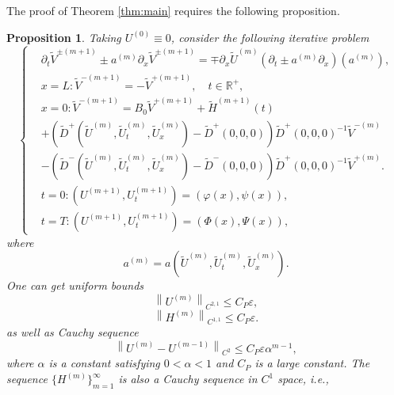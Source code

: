 \documentclass[a4paper,reqno,11pt]{amsart}
\numberwithin{equation}{section} %
\newtheorem{prop}[lem]{Proposition}
\begin{document}
The proof of Theorem \ref{thm:main} requires the following proposition.
\begin{prop}\label{prop:main}
	Taking $U^{(0)}\equiv 0$, consider the following iterative problem
	\begin{equation}
		\begin{cases}
		& \partial_t \widetilde{V}^{ \pm(m+1)} \pm a^{(m)} \partial_x \widetilde{V}^{ \pm(m+1)}=\mp \partial_x \widetilde{U}^{(m)}\left(\partial_t \pm a^{(m)} \partial_x\right)\left(a^{(m)}\right), \\
		& x=L: \widetilde{V}^{-(m+1)}=-\widetilde{V}^{+(m+1)}, \quad t \in \mathbb{R}^{+}, \\
		& x=0: \widetilde{V}^{-(m+1)}=B_0 \widetilde{V}^{+(m+1)}+\widetilde{H}^{(m+1)}(t) \\
		& +\left(\widetilde{D}^{+}\left(\widetilde{U}^{(m)}, \widetilde{U}_t^{(m)}, \widetilde{U}_x^{(m)}\right)-\widetilde{D}^{+}(0,0,0)\right) \widetilde{D}^{+}(0,0,0)^{-1} \widetilde{V}^{-(m)} \\
		& -\left(\widetilde{D}^{-}\left(\widetilde{U}^{(m)}, \widetilde{U}_t^{(m)}, \widetilde{U}_x^{(m)}\right)-\widetilde{D}^{-}(0,0,0)\right) \widetilde{D}^{+}(0,0,0)^{-1} \widetilde{V}^{+(m)}.\\
		& t=0:\left( U^{(m+1)},U^{(m+1)}_t \right) =\left( \varphi  \left( x \right) ,\psi \left( x \right) \right)  ,\\
		& t=T:\left( U^{(m+1)},U^{(m+1)}_t \right) =\left( \varPhi   \left( x \right) ,\varPsi  \left( x \right) \right) ,
	\end{cases}	
	\end{equation}
where
$$
a^{(m)}=a\left(\widetilde{U}^{(m)}, \widetilde{U}_t^{(m)}, \widetilde{U}_x^{(m)}\right) .
$$
One can get uniform bounds
\begin{equation}\label{bounds u}
 \left\lVert U^{\left( m \right)}\right\rVert  _{C^{2,1}}\leq C_P\varepsilon ,
\end{equation}
\begin{equation}\label{bounds h}
 \left\lVert H^{\left( m \right)}\right\rVert  _{C^{1,1}}\leq C_P\varepsilon .
\end{equation}
as well as Cauchy sequence 
\begin{equation}\label{cauchy u}
\left\lVert  U^{\left( m \right)}-U^{\left( m-1 \right)}\right\rVert  _{C^2}\leq C_P\varepsilon \alpha ^{m-1},
\end{equation}
where $\alpha$ is a constant satisfying $0<\alpha <1$ and $C_P$ is a large constant. The sequence $\{H^{(m)}\}_{m=1}^\infty$ is also a Cauchy sequence in $C^1$ space, i.e.,

\end{prop}
\end{document}
